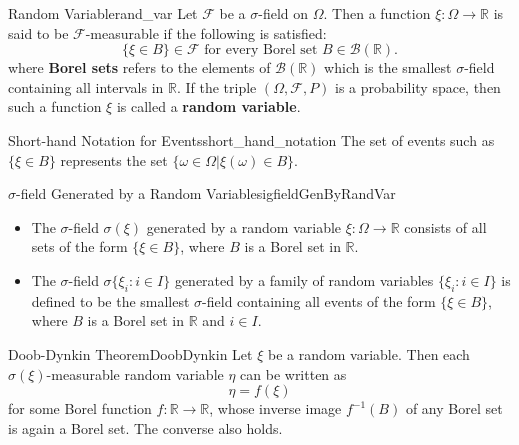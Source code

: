         \begin{defn}{Random Variable}{rand_var}
            Let $\mathcal{F}$ be a $\sigma$-field on $\Omega$. Then a function $\xi:\Omega \to \mathbb{R}$ is said to be
            $\mathcal{F}$-measurable if the following is satisfied:
            \begin{equation}
                \{\xi \in B\} \in \mathcal{F} \text{ for every Borel set }B \in \mathcal{B}(\mathbb{R}).
            \end{equation}
            where \textbf{Borel sets} refers to the elements of $\mathcal{B}(\mathbb{R})$ which is the smallest $\sigma$-field containing all intervals in $\mathbb{R}$.
            If the triple $(\Omega, \mathcal{F}, P)$ is a probability space, then such a function $\xi$ is called a \textbf{random variable}.
        \end{defn}
        \begin{rem}{Short-hand Notation for Events}{short_hand_notation}
            The set of events such as $\{\xi \in B\}$ represents the set $\{\omega \in \Omega | \xi(\omega) \in B\}$.
        \end{rem}

        \begin{defn}{$\sigma$-field Generated by a Random Variable}{sigfieldGenByRandVar}
            \begin{itemize}
                \item The $\sigma$-field $\sigma(\xi)$ generated by a random variable $\xi:\Omega \to \mathbb{R}$ consists of all sets of the form $\{\xi \in B\}$,
                where $B$ is a Borel set in $\mathbb{R}$.

                \item The $\sigma$-field $\sigma\{\xi_i:i\in I\}$ generated by a family of random variables $\{\xi_i:i \in I\}$ is defined
                to be the smallest $\sigma$-field containing all events of the form $\{\xi \in B\}$, where $B$ is a Borel set in $\mathbb{R}$ and $i \in I$.
            \end{itemize}
        \end{defn}
        
        \begin{thm}{Doob-Dynkin Theorem}{DoobDynkin}
            Let $\xi$ be a random variable. Then each $\sigma(\xi)$-measurable random variable $\eta$
            can be written as
            \begin{equation}
                \eta = f(\xi)
            \end{equation}
            for some Borel function $f:\mathbb{R} \to \mathbb{R}$, whose inverse image $f^{-1}(B)$ of any Borel set is again a Borel set.
            The converse also holds.
        \end{thm}

